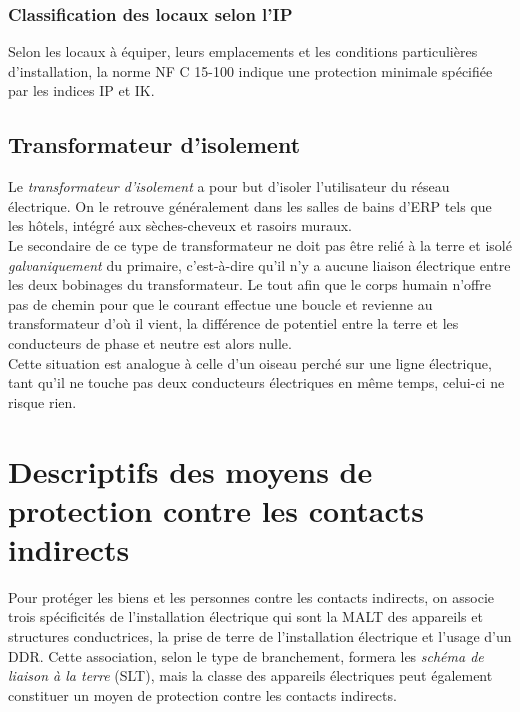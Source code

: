 

\subsubsection{Classification des locaux selon l'IP}

Selon les locaux à équiper, leurs emplacements et les conditions particulières d'installation, la norme NF C 15-100 indique une protection minimale spécifiée par les indices IP et IK.



\subsection{Transformateur d'isolement\label{subsec:tranformateur_isolement}}

Le \emph{transformateur d'isolement} a pour but d'isoler l'utilisateur du réseau électrique. On le retrouve généralement dans les salles de bains d'ERP tels que les hôtels, intégré aux sèches-cheveux et rasoirs muraux.\\ 



Le secondaire de ce type de transformateur ne doit pas être relié à la terre et isolé \emph{galvaniquement} du primaire, c'est-à-dire qu'il n'y a aucune liaison électrique entre les deux bobinages du transformateur. Le tout afin que le corps humain n'offre pas de chemin pour que le courant effectue une boucle et revienne au transformateur d'où il vient, la différence de potentiel entre la terre et les conducteurs de phase et neutre est alors nulle.\\Cette situation est analogue à celle d'un oiseau perché sur une ligne électrique, tant qu'il ne touche pas deux conducteurs électriques en même temps,  celui-ci ne risque rien.

\section{Descriptifs des moyens de protection contre les contacts indirects\label{sec:moyens_protection_contacts_indirects}}

Pour protéger les biens et les personnes contre les contacts indirects, on associe trois spécificités de l'installation électrique qui sont la MALT des appareils et structures conductrices, la prise de terre de l'installation électrique et l'usage d'un DDR. Cette association, selon le type de branchement, formera les \emph{schéma de liaison à la terre} (SLT), mais la classe des appareils électriques peut également constituer un moyen de protection contre les contacts indirects.

